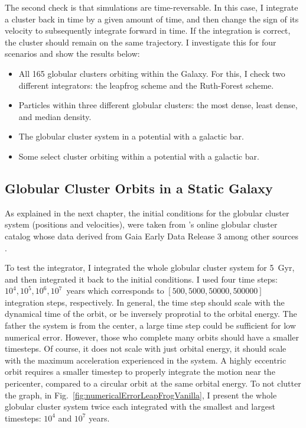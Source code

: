     The second check is that simulations are time-reversable. In this case, I integrate a cluster back in time by a given amount of time, and then change the sign of its velocity to subsequently integrate forward in time. If the integration is correct, the cluster should remain on the same trajectory. I investigate this for four scenarios and show the results below: 
    \begin{itemize}
        \item All 165 globular clusters orbiting within the Galaxy. For this, I check two different integrators: the leapfrog scheme and the Ruth-Forest scheme. 
        \item Particles within three different globular clusters: the most dense, least dense, and median density.
        \item The globular cluster system in a potential with a galactic bar. 
        \item Some select cluster orbiting within a potential with a galactic bar. 
    \end{itemize}

    \subsection{Globular Cluster Orbits in a Static Galaxy}

        As explained in the next chapter, the initial conditions for the globular cluster system (positions and velocities), were taken from \citet{2018MNRAS.478.1520B}'s online globular cluster catalog whose data derived from Gaia Early Data Release 3 among other sources \citep{2021MNRAS.505.5957B,2021A&A...649A...1G,2023A&A...674A...1G}. 

        To test the integrator, I integrated the whole globular cluster system for 5~Gyr, and then integrated it back to the initial conditions. I used four time steps: $10^4,10^5,10^6,10^7$~years which corresponds to $\left[500,5000,50000,500000\right]$ integration steps, respectively. In general, the time step should scale with the dynamical time of the orbit, or be inversely proprotial to the orbital energy. The father the system is from the center, a large time step could be sufficient for low numerical error. However, those who complete many orbits should have a smaller timesteps. Of course, it does not scale with just orbital energy, it should scale with the maximum acceleration experienced in the system. A highly eccentric orbit requires a smaller timestep to properly integrate the motion near the pericenter, compared to a circular orbit at the same orbital energy. To not clutter the graph, in Fig.~\ref{fig:numericalErrorLeapFrogVanilla}, I present the whole globular cluster system twice each integrated with the smallest and largest timesteps: $10^4$ and $10^7$ years. 

